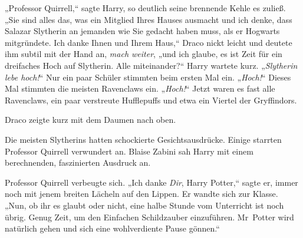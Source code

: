 „Professor Quirrell,“ sagte Harry, so deutlich seine brennende Kehle es zuließ. „Sie sind alles das, was ein Mitglied Ihres Hauses ausmacht und ich denke, dass Salazar Slytherin an jemanden wie Sie gedacht haben muss, als er Hogwarts mitgründete. Ich danke Ihnen und Ihrem Haus,“ Draco nickt leicht und deutete ihm subtil mit der Hand an, \emph{mach weiter}, „und ich glaube, es ist Zeit für ein dreifaches Hoch auf Slytherin. Alle miteinander?“ Harry wartete kurz. „\emph{Slytherin lebe hoch!}“ Nur ein paar Schüler stimmten beim ersten Mal ein. „\emph{Hoch!}“ Dieses Mal stimmten die meisten Ravenclaws ein. „\emph{Hoch!}“ Jetzt waren es fast alle Ravenclaws, ein paar verstreute Hufflepuffs und etwa ein Viertel der Gryffindors.

Draco zeigte kurz mit dem Daumen nach oben.

Die meisten Slytherins hatten schockierte Gesichtsausdrücke. Einige starrten Professor Quirrell verwundert an. Blaise Zabini sah Harry mit einem berechnenden, faszinierten Ausdruck an.

Professor Quirrell verbeugte sich. „Ich danke \emph{Dir}, Harry Potter,“ sagte er, immer noch mit jenem breiten Lächeln auf den Lippen. Er wandte sich zur Klasse. „Nun, ob ihr es glaubt oder nicht, eine halbe Stunde vom Unterricht ist noch übrig. Genug Zeit, um den Einfachen Schildzauber einzuführen. Mr~Potter wird natürlich gehen und sich eine wohlverdiente Pause gönnen.“


